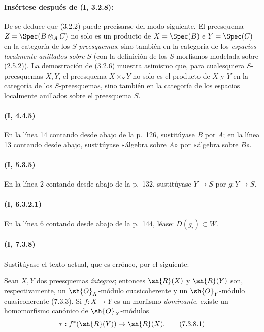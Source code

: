 \paragraph{Insértese después de (I, 3.2.8):}

\begin{env}[3.2.9]
\label{ega2:addendum:I.3.2.9-fr}
De  se deduce que (3.2.2) puede precisarse del modo
siguiente. El preesquema
$Z=\Spec(B\otimes_A C)$
no solo es un producto de $X=\Spec(B)$ e $Y=\Spec(C)$ en la categoría
de los $S$-\emph{preesquemas}, sino también en la categoría de los \emph{espacios
localmente anillados} \emph{sobre} $S$ (con la definición de los
$S$-morfismos modelada sobre (2.5.2)). La demostración de (3.2.6)
muestra asimismo que, para cualesquiera $S$-preesquemas $X,Y$, el
preesquema $X\times_S Y$ no solo es el producto de $X$ y $Y$ en la categoría de los
$S$-preesquemas, sino también en la categoría de los espacios
localmente anillados sobre el preesquema $S$.
\end{env}

\paragraph{(I, 4.4.5)}
En la línea 14 contando desde abajo de la p.~126, sustitúyase $B$ por
$A$; en la línea 13 contando desde abajo, sustitúyase «álgebra sobre
$A$» por «álgebra sobre $B$».

\paragraph{(I, 5.3.5)}
En la línea 2 contando desde abajo de la p.~132, sustitúyase $Y\to S$
por $g:Y\to S$.

\paragraph{(I, 6.3.2.1)}
En la línea 6 contando desde abajo de la p.~144, léase:
$D(g_i)\subset W$.

\paragraph{(I, 7.3.8)}
Sustitúyase el texto actual, que es erróneo, por el siguiente:

Sean $X,Y$ dos preesquemas \emph{íntegros}; entonces $\sh{R}(X)$ y
$\sh{R}(Y)$ son, respectivamente, un $\sh{O}_X$-módulo
cuasicoherente y un $\sh{O}_Y$-módulo cuasicoherente (7.3.3). Si
$f:X\to Y$ es un morfismo \emph{dominante}, existe un homomorfismo canónico
de $\sh{O}_X$-módulos
\begin{equation}
\label{ega2:addendum:I.7.3.8.1-fr}
  \tau:f^*(\sh{R}(Y))\to\sh{R}(X).
\tag{7.3.8.1}
\end{equation}

